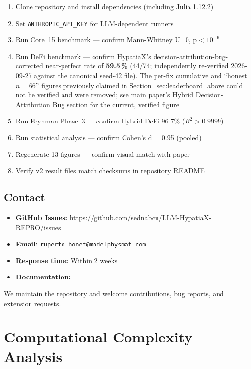 \documentclass[twoside,11pt]{article}
\begin{document}
\begin{enumerate}
\item Clone repository and install dependencies (including Julia 1.12.2)
\item Set \texttt{ANTHROPIC\_API\_KEY} for LLM-dependent runners
\item Run Core~15 benchmark — confirm Mann-Whitney U=0, p$<10^{-6}$
\item Run DeFi benchmark --- confirm HypatiaX's decision-attribution-bug-corrected
  near-perfect rate of \textbf{59.5\,\%} (44/74; independently re-verified
  2026-09-27 against the canonical seed-42 file). The per-fix cumulative
  and ``honest $n{=}66$'' figures previously claimed in
  Section~\ref{sec:leaderboard} above could not be verified and were
  removed; see main paper's Hybrid Decision-Attribution Bug section for
  the current, verified figure
\item Run Feynman Phase~3 — confirm Hybrid DeFi 96.7\% ($R^2>0.9999$)
\item Run statistical analysis — confirm Cohen's d = 0.95 (pooled)
\item Regenerate 13 figures — confirm visual match with paper
\item Verify v2 result files match checksums in repository README
\end{enumerate}

\subsection{Contact}

\begin{itemize}
\item \textbf{GitHub Issues:} \url{https://github.com/sednabcn/LLM-HypatiaX-REPRO/issues}
\item \textbf{Email:} \texttt{ruperto.bonet@modelphysmat.com}
\item \textbf{Response time:} Within 2 weeks
\item \textbf{Documentation:} 
\end{itemize}

We maintain the repository and welcome contributions, bug reports, and extension requests.



\section{Computational Complexity Analysis}
\label{app:complexity}
\end{document}

